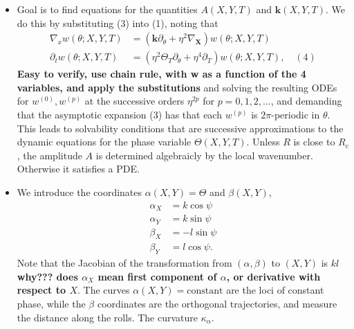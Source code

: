 \documentclass[12pt]{article}
\begin{document}
\begin{itemize}
    \item Goal is to find equations for the quantities $A(X,Y,T)$ and $\bm{k}(X,Y,T)$. We do this by substituting (3) into (1), noting that
        \begin{align*}
            \nabla_x w(\theta ; X,Y,T) &= (\bm{k}\partial_\theta + \eta^2 \nabla_{\bm{X}})w(\theta;X,Y,T)\\
            \partial_t w(\theta; X,Y,T) &= (\eta^2\Theta_T\partial_\theta +\eta^4\partial_T)w(\theta;X,Y,T), \quad (4)
        \end{align*}
        \textbf{Easy to verify, use chain rule, with w as a function of the 4 variables, and apply the substitutions}
        and solving the resulting ODEs for $w^{(0)}, w^{(p)}$ at the successive orders $\eta^{2p}$ for $p=0,1,2,\dots$, and demanding that the asymptotic expansion (3) has that each $w^{(p)}$ is $2\pi$-periodic in $\theta$. This leads to solvability conditions that are successive approximations to the dynamic equations for the phase variable $\Theta(X,Y,T)$. Unless $R$ is close to $R_c$, the amplitude $A$ is determined algebraicly by the local wavenumber. Otherwise it satisfies a PDE.
    \item We introduce the coordinates $\alpha(X,Y)=\Theta$ and $\beta(X,Y)$,
        \begin{align*}
            \alpha_X &= k\cos\psi\\
            \alpha_Y &= k\sin\psi\\
            \beta_X &= -l\sin\psi\\
            \beta_Y &= l\cos\psi.
        \end{align*}
        Note that the Jacobian of the transformation from $(\alpha,\beta)$ to $(X,Y)$ is $kl$ \textbf{why??? does $\alpha_X$ mean first component of $\alpha$, or derivative with respect to $X$}.\newline
        The curves $\alpha(X,Y)=\text{constant}$ are the loci of constant phase, while the $\beta$ coordinates are the orthogonal trajectories, and measure the distance along the rolls. The curvature $\kappa_{\alpha}$.


\end{itemize}
\end{document}
